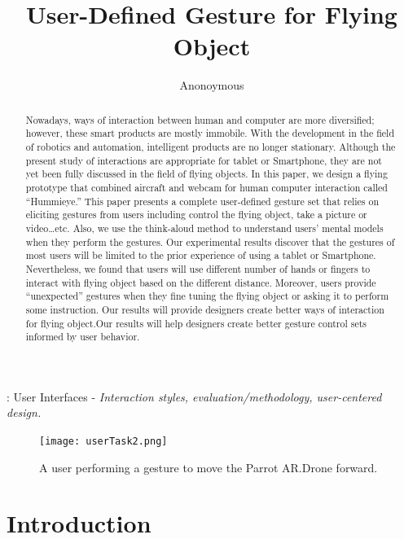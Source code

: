 \documentclass{sigchi}
\begin{document}
\title{User-Defined Gesture for Flying Object}

\author{
  \alignauthor Anonoymous
}

\maketitle

\begin{abstract}
Nowadays, ways of interaction between human and computer are more diversified; however, these smart products are mostly immobile. With the development in the field of robotics and automation, intelligent products are no longer stationary. Although the present study of interactions are appropriate for tablet or Smartphone, they are not yet been fully discussed in the field of flying objects. In this paper, we design a flying prototype that combined aircraft and webcam for human computer interaction called “Hummieye.” This paper presents a complete user-defined gesture set that relies on eliciting gestures from users including control the flying object, take a picture or video…etc. Also, we use the think-aloud method to understand users’ mental models when they perform the gestures. 
Our experimental results discover that the gestures of most users will be limited to the prior experience of using a tablet or Smartphone. Nevertheless, we found that users will use different number of hands or fingers to interact with flying object based on the different distance. Moreover, users provide “unexpected” gestures when they fine tuning the flying object or asking it to perform some instruction. Our results will provide designers create better ways of interaction for flying object.Our results will help designers create better gesture control sets informed by user behavior.
\end{abstract}


: User Interfaces - \emph{Interaction styles, evaluation/methodology, user-centered design.}

\begin{figure}[!h]
\centering
\texttt{[image: userTask2.png]}
\caption{A user performing a gesture to move the Parrot AR.Drone forward.}
\label{fig:figure1}
\end{figure}

\section{Introduction}
\end{document}
